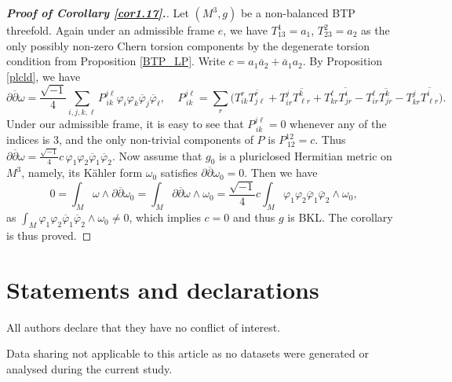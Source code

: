 \documentclass{amsart}
\numberwithin{equation}{section}
\theoremstyle{definition}
\renewcommand{\1}{\mathds{1}}
\renewcommand{\>}{\rightarrow}
\begin{document}
\begin{proof}[{\bf Proof of Corollary \ref{cor1.17}.}]
Let $(M^3,g)$ be a non-balanced BTP threefold. Again under an admissible frame $e$,
we have $T^1_{13}=a_1$, $T^2_{23}=a_2$ as the only possibly non-zero Chern torsion components
by the degenerate torsion condition from Proposition \ref{BTP_LP}.
Write $c=a_1\overline{a}_2+\overline{a}_1a_2$. By Proposition \ref{plcld}, we have
$$ \partial \overline{\partial} \omega = \frac{\sqrt{-1}}{4} \sum_{i,j,k,\ell} P^{j\ell }_{\,ik} \varphi_i\varphi_k \overline{\varphi}_j\overline{\varphi}_{\ell} , \ \ \ \ \ P^{j\ell}_{\,ik} = \sum_r \big( T^r_{ik}\overline{T^r_{j\ell} }   + T^j_{ir}\overline{T^k_{\ell r} } + T^{\ell}_{kr}\overline{T^i_{jr} } - T^{\ell}_{ir}\overline{T^k_{jr} } - T^j_{kr}\overline{T^i_{\ell r} } \big) .$$
Under our admissible frame, it is easy to see that $P^{j\ell}_{\,ik}=0$ whenever any of the indices is $3$, and the only non-trivial components of $P$ is $P^{12}_{\,12}=c$.
Thus $  \partial \overline{\partial} \omega = \frac{\sqrt{-1}}{4}c  \,\varphi_1\varphi_2 \overline{\varphi}_1\overline{\varphi}_2$.
Now assume that $g_0$ is a pluriclosed Hermitian metric on $M^3$, namely, its K\"ahler form $\omega_0$ satisfies $\partial \overline{\partial} \omega _0=0$. Then we have
$$ 0 = \int_M \omega \wedge \partial \overline{\partial} \omega_0=  \int_M \partial \overline{\partial} \omega \wedge \omega_0= \frac{\sqrt{-1}}{4}c \int_M \varphi_1\varphi_2 \overline{\varphi}_1\overline{\varphi}_2 \wedge \omega_0 , $$
as $\int_M \varphi_1\varphi_2 \overline{\varphi}_1\overline{\varphi}_2 \wedge \omega_0 \neq 0$, which implies $c=0$ and thus $g$ is BKL.
The corollary is thus proved.
\end{proof}




\vspace{0.3cm}

\section{Statements and declarations}


All authors declare that they have no conflict of interest.

\vspace{0.3cm}



Data sharing not applicable to this article as no datasets were generated or analysed during the current study.
\end{document}
